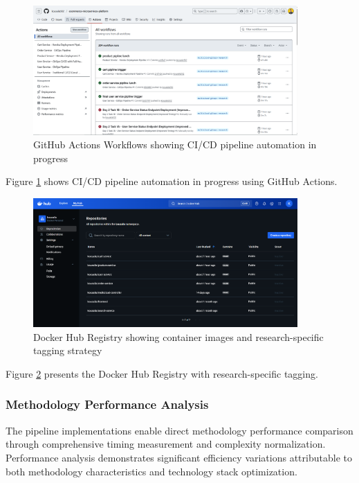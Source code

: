 \begin{figure}[H]
\centering
\includegraphics[width=0.9\textwidth]{figures/chapter5/github-actions-running.png}
\caption{GitHub Actions Workflows showing CI/CD pipeline automation in progress}
\label{fig:github-actions-running}
\end{figure}

Figure \ref{fig:github-actions-running} shows CI/CD pipeline automation in progress using GitHub Actions.

\begin{figure}[H]
\centering
\includegraphics[width=0.9\textwidth]{figures/chapter5/docker-images-registry.png}
\caption{Docker Hub Registry showing container images and research-specific tagging strategy}
\label{fig:docker-images-registry}
\end{figure}

Figure \ref{fig:docker-images-registry} presents the Docker Hub Registry with research-specific tagging.

\subsubsection{Methodology Performance Analysis}

The pipeline implementations enable direct methodology performance comparison through comprehensive timing measurement and complexity normalization. Performance analysis demonstrates significant efficiency variations attributable to both methodology characteristics and technology stack optimization.

